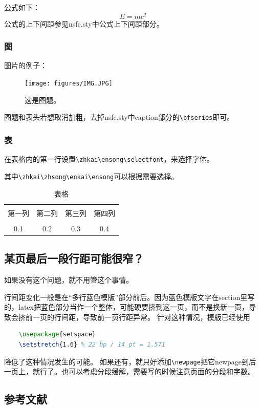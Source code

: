 公式如下：
\begin{equation}
	E=mc^2
\end{equation}
公式的上下间距参见nsfc.sty中公式上下间距部分。

\subsubsection{图}
图片的例子：
\begin{figure}[h!]
\centering %
\texttt{[image: figures/IMG.JPG]}
\captionsetup{justification=centering} %
\caption{这是图题。}
\end{figure}

图题和表头若想取消加粗，去掉nsfc.sty中caption部分的\verb|\bfseries|即可。


\subsubsection{表}
在表格内的第一行设置\verb|\zhkai\ensong\selectfont|，来选择字体。

其中\verb|\zhkai\zhsong\enkai\ensong|可以根据需要选择。
\begin{table}[htbp]
	\zhkai\ensong\selectfont%
	\centering  %
	\caption{表格}  %
	\label{table1}  %
	\begin{tabular}{|c|c|c|c|}  
		\hline  %
		& & & \\[-6pt]  %
		第一列&第二列&第三列&第四列 \\  %
		\hline
		& & & \\[-6pt]  %
		0.1&0.2&0.3&0.4 \\
		\hline
	\end{tabular}
\end{table}

\subsection{某页最后一段行距可能很窄？}
如果没有这个问题，就不用管这个事情。

行间距变化一般是在“多行蓝色模版”部分前后。因为蓝色模版文字在section里写的，latex把蓝色部分当作一个整体，可能硬要挤到这一页，而不是换新一页，导致会挤前一页的行间距，导致前一页行距异常。
针对这种情况，模版已经使用
\begin{lstlisting}[language=tex, basicstyle=\ttfamily\small, keywordstyle=\color{blue}, commentstyle=\color{gray}]
	%自动段落的行间距微调
	\usepackage{setspace}
	\setstretch{1.6} % 22 bp / 14 pt = 1.571
\end{lstlisting}
降低了这种情况发生的可能。
如果还有，就只好添加\verb|\newpage|把它newpage到后一页上，就行了。也可以考虑分段缓解，需要写的时候注意页面的分段和字数。

\begin{REF}
\subsection*{参考文献}
\vspace{-50pt}

\end{REF}

\newpage%
